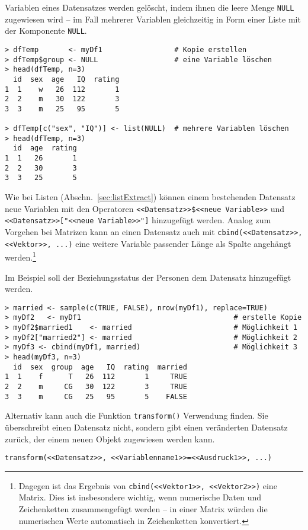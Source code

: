 Variablen eines Datensatzes werden gelöscht, indem ihnen die leere Menge \lstinline!NULL! zugewiesen wird -- im Fall mehrerer Variablen gleichzeitig in Form einer Liste mit der Komponente \lstinline!NULL!.
\begin{lstlisting}
> dfTemp       <- myDf1                 # Kopie erstellen
> dfTemp$group <- NULL                  # eine Variable löschen
> head(dfTemp, n=3)
  id  sex  age   IQ  rating
1  1    w   26  112       1
2  2    m   30  122       3
3  3    m   25   95       5

> dfTemp[c("sex", "IQ")] <- list(NULL)  # mehrere Variablen löschen
> head(dfTemp, n=3)
  id  age  rating
1  1   26       1
2  2   30       3
3  3   25       5
\end{lstlisting}

Wie bei Listen (Abschn.\ \ref{sec:listExtract}) können einem bestehenden Datensatz neue Variablen mit den Operatoren \lstinline!<<Datensatz>>$<<neue Variable>>! und \lstinline!<<Datensatz>>["<<neue Variable>>"]! hinzugefügt werden. Analog zum Vorgehen bei Matrizen kann an einen Datensatz auch mit \lstinline!cbind(<<Datensatz>>, <<Vektor>>, ...)! eine weitere Variable passender Länge als Spalte angehängt werden.\footnote{Dagegen ist das Ergebnis von \lstinline!cbind(<<Vektor1>>, <<Vektor2>>)! eine Matrix. Dies ist insbesondere wichtig, wenn numerische Daten und Zeichenketten zusammengefügt werden -- in einer Matrix würden die numerischen Werte automatisch in Zeichenketten konvertiert.}

Im Beispiel soll der Beziehungsstatus der Personen dem Datensatz hinzugefügt werden.
\begin{lstlisting}
> married <- sample(c(TRUE, FALSE), nrow(myDf1), replace=TRUE)
> myDf2   <- myDf1                                    # erstelle Kopie
> myDf2$married1    <- married                        # Möglichkeit 1
> myDf2["married2"] <- married                        # Möglichkeit 2
> myDf3 <- cbind(myDf1, married)                      # Möglichkeit 3
> head(myDf3, n=3)
  id  sex  group  age   IQ  rating  married
1  1    f      T   26  112       1     TRUE
2  2    m     CG   30  122       3     TRUE
3  3    m     CG   25   95       5    FALSE
\end{lstlisting}

Alternativ kann auch die Funktion \lstinline!transform()! Verwendung finden. Sie überschreibt einen Datensatz nicht, sondern gibt einen veränderten Datensatz zurück, der einem neuen Objekt zugewiesen werden kann.
\begin{lstlisting}
transform(<<Datensatz>>, <<Variablenname1>>=<<Ausdruck1>>, ...)
\end{lstlisting}


